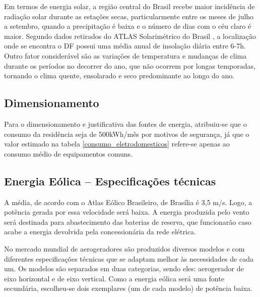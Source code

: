 	Em termos de energia solar, a região central do Brasil recebe maior incidência de radiação solar durante as estações secas, particularmente entre os meses de julho a setembro, quando a precipitação é baixa e o número de dias com o céu claro é maior. Segundo dados retirados do ATLAS Solarimétrico do Brasil \cite{2000UFPE}, a localização onde se encontra o DF possui uma média anual de insolação diária entre 6-7h. Outro fator considerável são as variações de temperatura e mudanças de clima durante os períodos no decorrer do ano, que não ocorrem por longas temporadas, tornando o clima quente, ensolarado e seco predominante ao longo do ano.

\subsection{Dimensionamento}

	Para o dimensionamento e justificativa das fontes de energia, atribuiu-se que o consumo da residência seja de 500kWh/mês por motivos de segurança, já que o valor estimado na tabela \ref{consumo_eletrodomesticos} refere-se apenas ao consumo médio de equipamentos comuns.

\subsection{Energia Eólica -- Especificações técnicas}

	A média, de acordo com o Atlas Eólico Brasileiro, de Brasília é 3,5 m/s. Logo, a potência gerada por essa velocidade será baixa. A energia produzida pelo vento será destinada para abastecimento das baterias de reserva, que funcionarão caso acabe a energia devolvida pela concessionária da rede elétrica.

	No mercado mundial de aerogeradores são produzidos diversos modelos e com diferentes especificações técnicas que se adaptam melhor às necessidades de cada um. Os modelos são separados em duas categorias, sendo eles: aerogerador de eixo horizontal e de eixo vertical. Como a energia eólica será uma fonte secundária, escolheu-se dois exemplares (um de cada modelo) de potência baixa.

